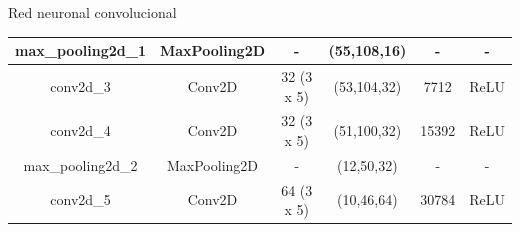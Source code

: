 \documentclass[10pt]{beamer}
\begin{document}
\begin{frame}{Red neuronal convolucional}
\begin{table}[!h]
{\begin{tabular}{@{}cccccc@{}}
        \multicolumn{1}{|c|}{max\_pooling2d\_1} & \multicolumn{1}{c|}{MaxPooling2D}  & \multicolumn{1}{c|}{-}                                                                     & \multicolumn{1}{c|}{(55,108,16)}                                                               & \multicolumn{1}{c|}{-}                                                                          & \multicolumn{1}{c|}{-}                                                                         \\ \midrule
        \multicolumn{1}{|c|}{conv2d\_3}         & \multicolumn{1}{c|}{Conv2D}        & \multicolumn{1}{c|}{32 (3 x 5)}                                                            & \multicolumn{1}{c|}{(53,104,32)}                                                               & \multicolumn{1}{c|}{7712}                                                                       & \multicolumn{1}{c|}{ReLU}                                                                      \\ \midrule
        \multicolumn{1}{|c|}{conv2d\_4}         & \multicolumn{1}{c|}{Conv2D}        & \multicolumn{1}{c|}{32 (3 x 5)}                                                            & \multicolumn{1}{c|}{(51,100,32)}                                                               & \multicolumn{1}{c|}{15392}                                                                      & \multicolumn{1}{c|}{ReLU}                                                                      \\ \midrule
        \multicolumn{1}{|c|}{max\_pooling2d\_2} & \multicolumn{1}{c|}{MaxPooling2D}  & \multicolumn{1}{c|}{-}                                                                     & \multicolumn{1}{c|}{(12,50,32)}                                                                & \multicolumn{1}{c|}{-}                                                                          & \multicolumn{1}{c|}{-}                                                                         \\ \midrule
        \multicolumn{1}{|c|}{conv2d\_5}         & \multicolumn{1}{c|}{Conv2D}        & \multicolumn{1}{c|}{64 (3 x 5)}                                                            & \multicolumn{1}{c|}{(10,46,64)}                                                                & \multicolumn{1}{c|}{30784}                                                                      & \multicolumn{1}{c|}{ReLU}                                                                      \\ \midrule

\end{tabular}}
\end{table}
\end{frame}
\end{document}
